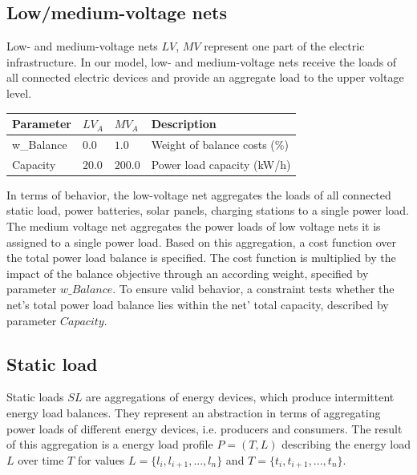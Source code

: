 \subsection{Low/medium-voltage nets}

Low- and medium-voltage nets $LV$, $MV$ represent one part of the electric infrastructure. In our model, low- and medium-voltage nets receive the loads of all connected electric devices and provide an aggregate load to the upper voltage level.

\begin{table}[h]
	\renewcommand{\arraystretch}{1.3}
	\centering
	\begin{tabularx}{\columnwidth}{lllX}
		\hline
		\textbf{Parameter}   & \textbf{$LV_{A}$} & \textbf{$MV_{A}$}  & Description \\ \hline
		w\_Balance       & $0.0$ & $1.0$ & Weight of balance costs (\%) \\  
		Capacity          & $20.0$ & $200.0$ & Power load capacity (kW/h)     \\ \hline
	\end{tabularx}
\end{table}

In terms of behavior, the low-voltage net aggregates the loads of all connected static load, power batteries, solar panels, charging stations to a single power load. The medium voltage net aggregates the power loads of low voltage nets it is assigned to a single power load. Based on this aggregation, a cost function over the total power load balance is specified. The cost function is multiplied by the impact of the balance objective through an according weight, specified by parameter $w\_Balance$. To ensure valid behavior, a constraint tests whether the net's total power load balance lies within the net' total capacity, described by parameter $Capacity$.

\subsection{Static load}

Static loads $SL$ are aggregations of energy devices, which produce intermittent energy load balances. They represent an abstraction in terms of aggregating power loads of different energy devices, i.e. producers and consumers. The result of this aggregation is a energy load profile $P = (T, L)$ describing the energy load $L$ over time $T$ for values $L = \{l_i, l_{i+1}, ..., l_n\}$ and $T = \{t_i, t_{i+1},..., t_n\}$.

